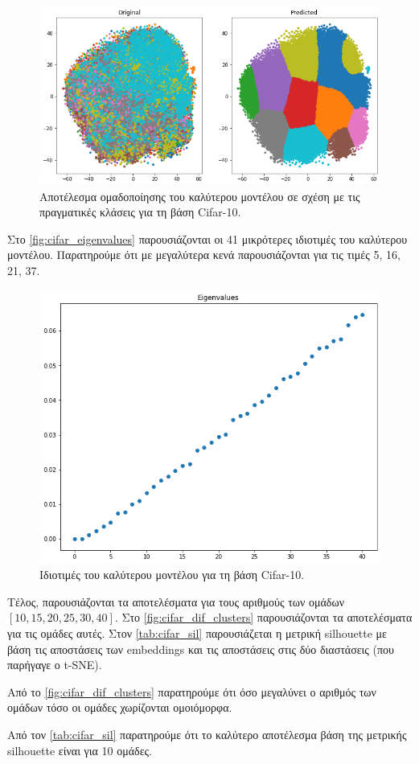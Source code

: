 \documentclass[a4paper]{article}
\begin{document}
\begin{figure}[H]
    \centering
    \includegraphics[width=0.6\linewidth]{cifar/best_model_results.png}
    \caption{Αποτέλεσμα ομαδοποίησης του καλύτερου μοντέλου σε σχέση με τις
    πραγματικές κλάσεις για τη βάση Cifar-10.}
    \label{fig:cifar_best_model_results}
\end{figure}

Στο \autoref{fig:cifar_eigenvalues} παρουσιάζονται οι 41 μικρότερες ιδιοτιμές
του καλύτερου μοντέλου. Παρατηρούμε ότι με μεγαλύτερα κενά παρουσιάζονται για
τις τιμές 5, 16, 21, 37.

\begin{figure}[H]
    \centering
    \includegraphics[width=0.6\linewidth]{cifar/eigenvalues.png}
    \caption{Ιδιοτιμές του καλύτερου μοντέλου για τη βάση Cifar-10.}
    \label{fig:cifar_eigenvalues}
\end{figure}

Τέλος, παρουσιάζονται τα αποτελέσματα για τους αριθμούς των ομάδων $[10, 15, 20,
25, 30, 40]$. Στο \autoref{fig:cifar_dif_clusters} παρουσιάζονται τα
αποτελέσματα για τις ομάδες αυτές. Στον \autoref{tab:cifar_sil} παρουσιάζεται η
μετρική silhouette με βάση τις αποστάσεις των embeddings και τις αποστάσεις στις
δύο διαστάσεις (που παρήγαγε ο t-SNE).

Από το \autoref{fig:cifar_dif_clusters} παρατηρούμε ότι όσο μεγαλύνει ο αριθμός
των ομάδων τόσο οι ομάδες χωρίζονται ομοιόμορφα.

Από τον \autoref{tab:cifar_sil} παρατηρούμε ότι το καλύτερο αποτέλεσμα βάση της
μετρικής silhouette είναι για 10 ομάδες.
\end{document}
